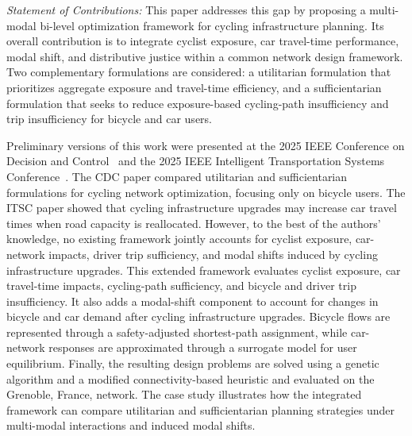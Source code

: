 \documentclass[lettersize,journal]{IEEEtran}
\begin{document}
\textit{Statement of Contributions:}
This paper addresses this gap by proposing a multi-modal bi-level optimization framework for cycling infrastructure planning. Its overall contribution is to integrate cyclist exposure, car travel-time performance, modal shift, and distributive justice within a common network design framework. Two complementary formulations are considered: a utilitarian formulation that prioritizes aggregate exposure and travel-time efficiency, and a sufficientarian formulation that seeks to reduce exposure-based cycling-path insufficiency and trip insufficiency for bicycle and car users.

Preliminary versions of this work were presented at the 2025 IEEE Conference on Decision and Control~\cite{jurado2025transport} and the 2025 IEEE Intelligent Transportation Systems Conference~\cite{jurado2025safety}. The CDC paper compared utilitarian and sufficientarian formulations for cycling network optimization, focusing only on bicycle users. The ITSC paper showed that cycling infrastructure upgrades may increase car travel times when road capacity is reallocated. However, to the best of the authors' knowledge, no existing framework jointly accounts for cyclist exposure, car-network impacts, driver trip sufficiency, and modal shifts induced by cycling infrastructure upgrades. This extended framework evaluates cyclist exposure, car travel-time impacts, cycling-path sufficiency, and bicycle and driver trip insufficiency. It also adds a modal-shift component to account for changes in bicycle and car demand after cycling infrastructure upgrades. Bicycle flows are represented through a safety-adjusted shortest-path assignment, while car-network responses are approximated through a surrogate model for user equilibrium. Finally, the resulting design problems are solved using a genetic algorithm and a modified connectivity-based heuristic and evaluated on the Grenoble, France, network. The case study illustrates how the integrated framework can compare utilitarian and sufficientarian planning strategies under multi-modal interactions and induced modal shifts.


\end{document}
